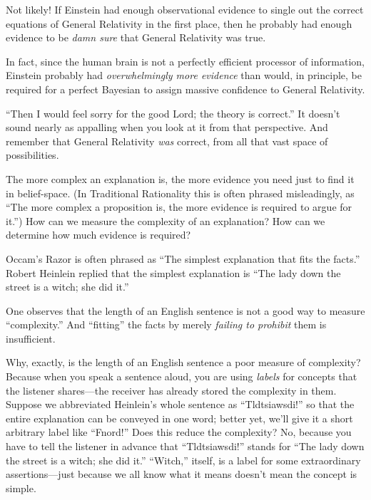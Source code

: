 {
 Not likely! If Einstein had enough observational evidence to
single out the correct equations of General Relativity in the first
place, then he probably had enough evidence to be \textit{damn sure}
that General Relativity was true.}

{
 In fact, since the human brain is not a perfectly efficient
processor of information, Einstein probably had \textit{overwhelmingly
more evidence} than would, in principle, be required for a perfect
Bayesian to assign massive confidence to General Relativity.}

{
 ``Then I would feel sorry for the good Lord; the
theory is correct.'' It doesn't sound
nearly as appalling when you look at it from that perspective. And
remember that General Relativity \textit{was} correct, from all that
vast space of possibilities.}

\myendsectiontext


{
 The more complex an explanation is, the more evidence you need
just to find it in belief-space. (In Traditional Rationality this is
often phrased misleadingly, as ``The more complex a
proposition is, the more evidence is required to argue for
it.'') How can we measure the complexity of an
explanation? How can we determine how much evidence is required? }

{
 Occam's Razor is often phrased as
``The simplest explanation that fits the
facts.'' Robert Heinlein replied that the simplest
explanation is ``The lady down the street is a witch;
she did it.''}

{
 One observes that the length of an English sentence is not a good
way to measure ``complexity.'' And
``fitting'' the facts by merely
\textit{failing to prohibit} them is insufficient.}

{
 Why, exactly, is the length of an English sentence a poor measure
of complexity? Because when you speak a sentence aloud, you are using
\textit{labels} for concepts that the listener shares---the receiver
has already stored the complexity in them. Suppose we abbreviated
Heinlein's whole sentence as
``Tldtsiawsdi!'' so that the entire
explanation can be conveyed in one word; better yet,
we'll give it a short arbitrary label like
``Fnord!'' Does this reduce the
complexity? No, because you have to tell the listener in advance that
``Tldtsiawsdi!'' stands for
``The lady down the street is a witch; she did
it.'' ``Witch,''
itself, is a label for some extraordinary assertions---just because we
all know what it means doesn't mean the concept is
simple.}

